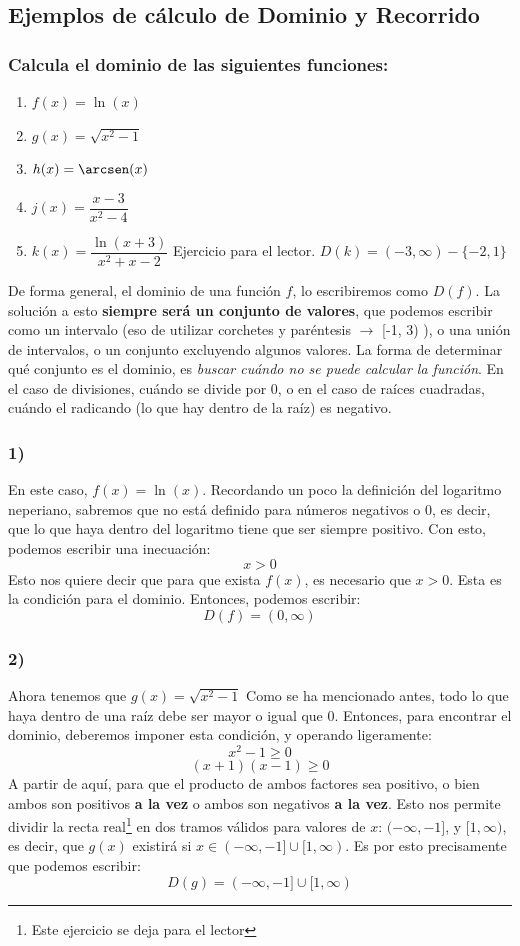 \documentclass[sans]{apuntes}
\begin{document}
\begin{examplebox}
	\subsection*{Ejemplos de cálculo de Dominio y Recorrido}
	\subsubsection*{Calcula el dominio de las siguientes funciones:}
	\begin{enumerate}[label=\bfseries \arabic*)]
		\item $f(x) = \ln(x)$
		\item $g(x) = \sqrt{x^2 - 1}$
		\item $h(x) = \arcsen(x)$
		\item $j(x) = \dfrac{x - 3}{x^2 - 4}$
		\item $k(x) = \dfrac{\ln(x + 3)}{x^2 + x - 2}$ Ejercicio para el lector. $D(k) = (-3, \infty) - \{-2, 1\}$
	\end{enumerate}
	De forma general, el dominio de una función $f$, lo escribiremos como $D(f)$. La solución a esto \textbf{siempre será un conjunto de valores}, que podemos escribir como un intervalo (eso de utilizar corchetes y paréntesis $\to$ [-1, 3) ), o una unión de intervalos, o un conjunto excluyendo algunos valores. La forma de determinar qué conjunto es el dominio, es \emph{buscar cuándo no se puede calcular la función}. En el caso de divisiones, cuándo se divide por 0, o en el caso de raíces cuadradas, cuándo el radicando (lo que hay dentro de la raíz) es negativo.
	\subsubsection*{1)}
	En este caso, $f(x) = \ln(x)$. Recordando un poco la definición del logaritmo neperiano, sabremos que no está definido para números negativos o 0, es decir, que lo que haya dentro del logaritmo tiene que ser siempre positivo. Con esto, podemos escribir una inecuación:
	\[ x > 0\]
	Esto nos quiere decir que para que exista $f(x)$, es necesario que $x > 0$. Esta es la condición para el dominio. Entonces, podemos escribir:
	\[D(f) = (0, \infty) \]

	\subsubsection*{2)}
	Ahora tenemos que $g(x) = \sqrt{x^2 - 1}$ Como se ha mencionado antes, todo lo que haya dentro de una raíz debe ser mayor o igual que 0. Entonces, para encontrar el dominio, deberemos imponer esta condición, y operando ligeramente:
	\[ x^2 - 1 \geq 0\]
	\[(x + 1)(x - 1)\geq 0\]
	A partir de aquí, para que el producto de ambos factores sea positivo, o bien ambos son positivos \textbf{a la vez} o ambos son negativos \textbf{a la vez}. Esto nos permite dividir la recta real\footnote{Este ejercicio se deja para el lector} en dos tramos válidos para valores de $x$: $(-\infty, -1]$, y $[1, \infty)$, es decir, que $g(x)$ existirá si $x \in (-\infty, -1] \cup [1, \infty)$. Es por esto precisamente que podemos escribir:
	\[D(g) = (-\infty, -1] \cup [1, \infty)\]


\end{examplebox}
\end{document}
